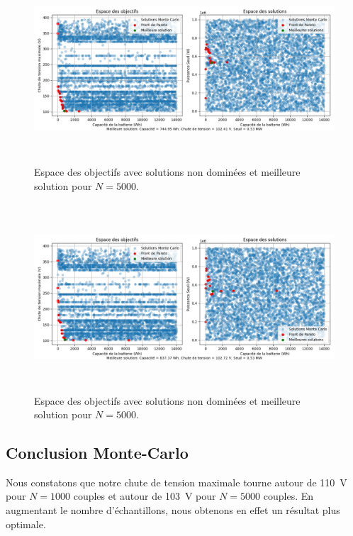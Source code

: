 \documentclass[11pt, a4paper, oneside, portrait]{report}
\begin{document}
            \begin{figure}[H]
                \centering
                \includegraphics[height=7cm]{Monte-Carlo_5000(1).png}
                \caption{Espace des objectifs avec solutions non dominées et meilleure solution pour $N = 5000$.}
            \end{figure}

            \begin{figure}[H]
                \centering
                \includegraphics[height=7cm]{Monte-Carlo_5000(2).png}
                \caption{Espace des objectifs avec solutions non dominées et meilleure solution pour $N = 5000$.}
            \end{figure}

            \subsection*{Conclusion Monte-Carlo}
                Nous constatons que notre chute de tension maximale tourne autour de 110~V pour $N= 1000$ couples et autour de 103~V pour $N = 5000$ couples. En augmentant le nombre d'échantillons, nous obtenons en effet un résultat plus optimale.
\end{document}
